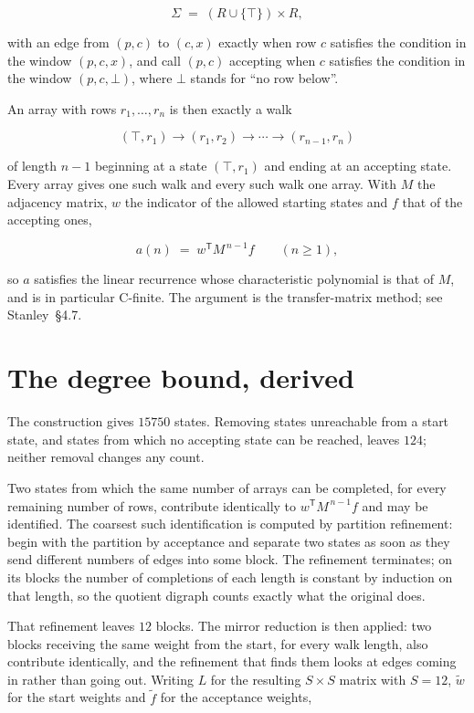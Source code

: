 \documentclass[11pt]{article}
\theoremstyle{definition}
\begin{document}
\[\Sigma \;=\; (R \cup \{\top\}) \times R,\]

with an edge from $(p,c)$ to $(c,x)$ exactly when row $c$ satisfies the condition in the window $(p,c,x)$, and call $(p,c)$ accepting when $c$ satisfies the condition in the window $(p,c,\bot)$, where $\bot$ stands for ``no row below''.

An array with rows $r_1,\dots,r_n$ is then exactly a walk

\[(\top,r_1) \to (r_1,r_2) \to \cdots \to (r_{n-1},r_n)\]

of length $n-1$ beginning at a state $(\top,r_1)$ and ending at an accepting state. Every array gives one such walk and every such walk one array. With $M$ the adjacency matrix, $w$ the indicator of the allowed starting states and $f$ that of the accepting ones,

\[a(n) \;=\; w^{\mathsf T} M^{\,n-1} f \qquad (n \ge 1),\]

so $a$ satisfies the linear recurrence whose characteristic polynomial is that of $M$, and is in particular C-finite. The argument is the transfer-matrix method; see Stanley~\S4.7.

\section{The degree bound, derived}

The construction gives $15750$ states. Removing states unreachable from a start state, and states from which no accepting state can be reached, leaves $124$; neither removal changes any count.

Two states from which the same number of arrays can be completed, for every remaining number of rows, contribute identically to $w^{\mathsf T}M^{\,n-1}f$ and may be identified. The coarsest such identification is computed by partition refinement: begin with the partition by acceptance and separate two states as soon as they send different numbers of edges into some block. The refinement terminates; on its blocks the number of completions of each length is constant by induction on that length, so the quotient digraph counts exactly what the original does.

That refinement leaves $12$ blocks. The mirror reduction is then applied: two blocks receiving the same weight from the start, for every walk length, also contribute identically, and the refinement that finds them looks at edges coming in rather than going out. Writing $L$ for the resulting $S \times S$ matrix with $S = 12$, $\tilde w$ for the start weights and $\tilde f$ for the acceptance weights,
\end{document}
